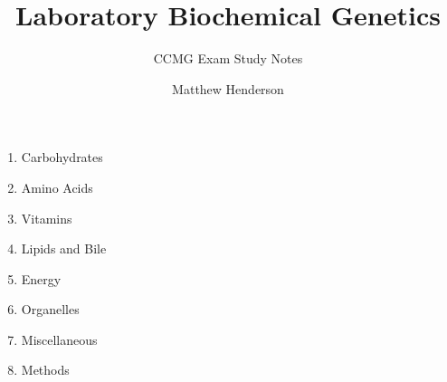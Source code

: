 \documentclass[12pt]{scrartcl}
\title{Laboratory Biochemical Genetics}
\author{Matthew Henderson}
\subtitle{CCMG Exam Study Notes}
\begin{document}
\maketitle

\vspace*{100}
\begin{center}
  \begin{enumerate}\bfseries\Large
  \item Carbohydrates
  \item Amino Acids
  \item Vitamins
  \item Lipids and Bile
  \item Energy
  \item Organelles
  \item Miscellaneous
  \item Methods
  \end{enumerate}
\end{center}
\end{document}
